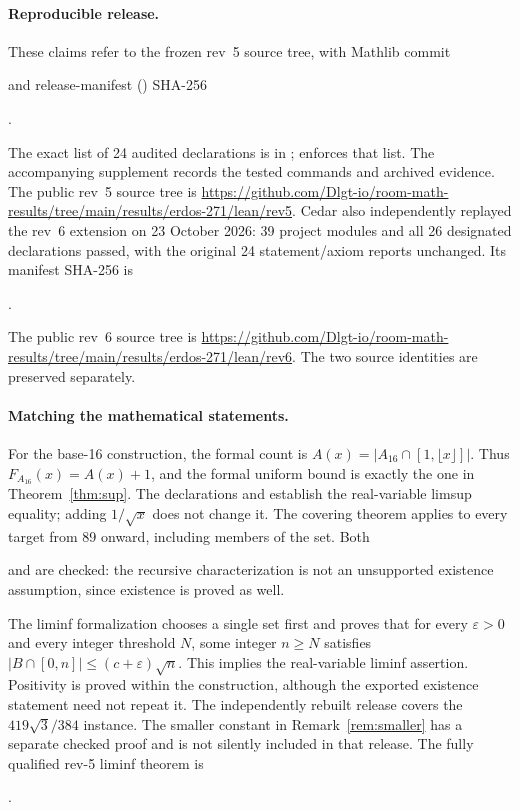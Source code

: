 \documentclass[11pt]{article}
\theoremstyle{definition}\newtheorem{definition}[theorem]{Definition}
\theoremstyle{remark}\newtheorem{remark}[theorem]{Remark}
\numberwithin{equation}{section}
\newcommand{\card}[1]{\lvert #1\rvert}
\begin{document}
\paragraph{Reproducible release.}
These claims refer to the frozen rev~5 source tree, with Mathlib commit
\par\noindent{}\par
and release-manifest () SHA-256
\par\noindent{}.\par
The exact list of 24 audited declarations is in ;
 enforces that list. The accompanying supplement
records the tested commands and archived evidence.
The public rev~5 source tree is
\url{https://github.com/Dlgt-io/room-math-results/tree/main/results/erdos-271/lean/rev5}.
Cedar also independently replayed the rev~6 extension on 23 October 2026:
39 project modules and all 26 designated declarations passed, with the original
24 statement/axiom reports unchanged. Its manifest SHA-256 is
\par\noindent{}.\par
The public rev~6 source tree is
\url{https://github.com/Dlgt-io/room-math-results/tree/main/results/erdos-271/lean/rev6}.
The two source identities are preserved separately.

\paragraph{Matching the mathematical statements.}
For the base-16 construction, the formal count is
$A(x)=\card{A_{16}\cap[1,\lfloor x\rfloor]}$. Thus
$F_{A_{16}}(x)=A(x)+1$, and the formal uniform bound is exactly the one in
Theorem~\ref{thm:sup}. The declarations  and
 establish the real-variable limsup equality; adding
$1/\sqrt x$ does not change it. The covering theorem applies to every target
from 89 onward, including members of the set. Both
\par\noindent{}\par
and  are checked: the recursive characterization
is not an unsupported existence assumption, since existence is proved as well.

The liminf formalization chooses a single set first and proves that for every
$\varepsilon>0$ and every integer threshold $N$, some integer $n\ge N$
satisfies $\card{B\cap[0,n]}\le(c+\varepsilon)\sqrt n$. This implies the
real-variable liminf assertion. Positivity is proved within the construction,
although the exported existence statement need not repeat it. The independently
rebuilt release covers the $419\sqrt3/384$ instance. The smaller constant in
Remark~\ref{rem:smaller} has a separate checked proof and is not silently
included in that release. The fully qualified rev-5 liminf theorem is
\par\noindent{}.\par
\end{document}
